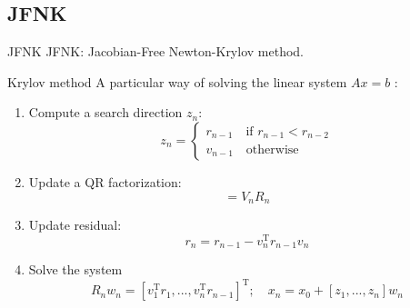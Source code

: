 \documentclass[10pt,t,xcolor=table,compress]{UWMadBeamer}
\begin{document}
    \subsection*{JFNK}
    \begin{frame}{JFNK}
        JFNK: Jacobian-Free Newton-Krylov method.
    \end{frame}
    \begin{frame}{Krylov method}
        A particular way of solving the linear system $A x = b$ :
        \begin{enumerate}
            \item{Compute a search direction $z_n$:
                \begin{equation}
                    z_n = \begin{cases}
                        r_{n-1} \quad \text{if } r_{n-1} < r_{n-2} \\
                        v_{n-1} \quad \text{otherwise}
                    \end{cases}
                \end{equation}
            }
            \item{Update a QR factorization:
                \begin{equation}
                    [A\,z_1,A\,z_2,...,A\,z_n] = V_n R_n
                \end{equation}
            }
            \item{Update residual:
                \begin{equation}
                    r_n = r_{n-1} - v_n^{\text{T}} r_{n-1}  v_n
                \end{equation}
            }
            \item{Solve the system
                \begin{equation}
                    R_n w_n = [v_1^{\text{T}} r_{1} ,...,v_n^{\text{T}} r_{n-1}]^{\text{T}};
                    \quad
                    x_n = x_0 + [z_1,...,z_n]w_n
                \end{equation}
            }
        \end{enumerate}
    \end{frame}
        
\end{document}
